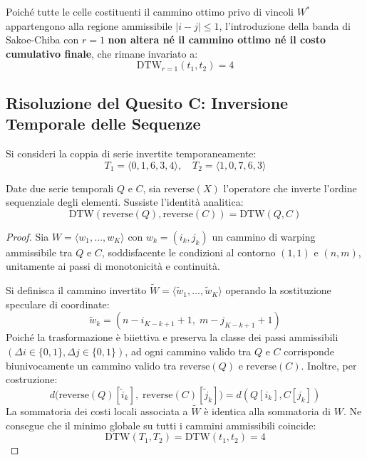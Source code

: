 \begin{proposition}
Poich\'e tutte le celle costituenti il cammino ottimo privo di vincoli $W^*$ appartengono alla regione ammissibile $|i - j| \le 1$, l'introduzione della banda di Sakoe-Chiba con $r=1$ \textbf{non altera n\'e il cammino ottimo n\'e il costo cumulativo finale}, che rimane invariato a:
\begin{equation*}
\text{DTW}_{r=1}(t_1, t_2) = 4
\end{equation*}
\end{proposition}

\FloatBarrier
\subsection{Risoluzione del Quesito C: Inversione Temporale delle Sequenze}
\label{subsec:ts-exercise-solution-c}

Si consideri la coppia di serie invertite temporaneamente:
\begin{equation*}
T_1 = \langle 0, 1, 6, 3, 4 \rangle, \quad T_2 = \langle 1, 0, 7, 6, 3 \rangle
\end{equation*}

\begin{theorem}
Date due serie temporali $Q$ e $C$, sia $\text{reverse}(X)$ l'operatore che inverte l'ordine sequenziale degli elementi. Sussiste l'identit\`a analitica:
\begin{equation}
\label{eq:dtw-reversal-invariance}
\text{DTW}(\text{reverse}(Q), \text{reverse}(C)) = \text{DTW}(Q, C)
\end{equation}
\end{theorem}

\begin{proof}
Sia $W = \langle w_1, \dots, w_K \rangle$ con $w_k = (i_k, j_k)$ un cammino di warping ammissibile tra $Q$ e $C$, soddisfacente le condizioni al contorno $(1,1)$ e $(n,m)$, unitamente ai passi di monotonicit\`a e continuit\`a. 

Si definisca il cammino invertito $\widetilde{W} = \langle \tilde{w}_1, \dots, \tilde{w}_K \rangle$ operando la sostituzione speculare di coordinate:
\begin{equation*}
\tilde{w}_k = (n - i_{K - k + 1} + 1, \; m - j_{K - k + 1} + 1)
\end{equation*}
Poich\'e la trasformazione \`e biiettiva e preserva la classe dei passi ammissibili $(\Delta i \in \{0,1\}, \Delta j \in \{0,1\})$, ad ogni cammino valido tra $Q$ e $C$ corrisponde biunivocamente un cammino valido tra $\text{reverse}(Q)$ e $\text{reverse}(C)$. Inoltre, per costruzione:
\begin{equation*}
d\big(\text{reverse}(Q)[\tilde{i}_k], \; \text{reverse}(C)[\tilde{j}_k]\big) = d(Q[i_k], C[j_k])
\end{equation*}
La sommatoria dei costi locali associata a $\widetilde{W}$ \`e identica alla sommatoria di $W$. Ne consegue che il minimo globale su tutti i cammini ammissibili coincide:
\begin{equation*}
\text{DTW}(T_1, T_2) = \text{DTW}(t_1, t_2) = 4
\end{equation*}
\end{proof}

